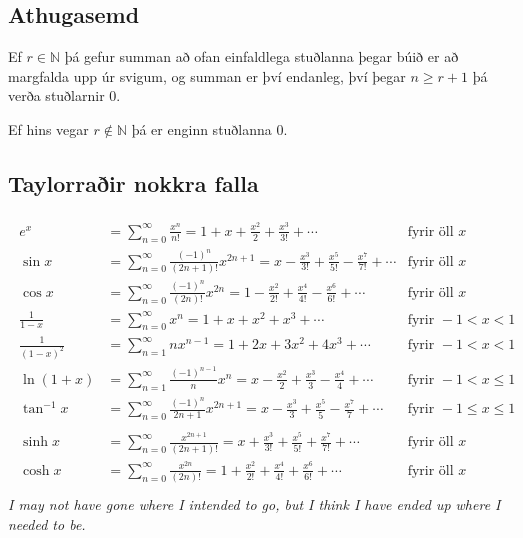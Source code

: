 \documentclass[b5paper,11pt,icelandic]{sphinxmanual}
\begin{document}
\subsection{Athugasemd}
\label{kafli10:id6}
Ef \(r \in {{\mathbb  N}}\) þá gefur summan að ofan einfaldlega
stuðlanna þegar búið er að margfalda upp úr svigum, og summan er því
endanleg, því þegar \(n \geq r+1\) þá verða stuðlarnir 0.

Ef hins vegar \(r\notin {{\mathbb  N}}\) þá er enginn stuðlanna 0.


\subsection{Taylorraðir nokkra falla}
\label{kafli10:taylorrair-nokkra-falla}\begin{equation*}
\begin{split}\begin{aligned}
e^x&=\sum_{n=0}^\infty\frac{x^n}{n!}
    =1+x+\frac{x^2}{2}+\frac{x^3}{3!}
    +\cdots
  &\mbox{fyrir öll }x\\
\sin x&=  \sum_{n=0}^\infty\frac{(-1)^n}{(2n+1)!}x^{2n+1}
    =x-\frac{x^3}{3!}+\frac{x^5}{5!}-\frac{x^7}{7!}+\cdots
    &\mbox{fyrir öll }x\\
\cos x&=  \sum_{n=0}^\infty\frac{(-1)^n}{(2n)!}x^{2n}
    =1-\frac{x^2}{2!}+\frac{x^4}{4!}-\frac{x^6}{6!}+\cdots
    &\mbox{fyrir öll }x\\
\frac{1}{1-x}&=\sum_{n=0}^\infty x^n
    =1+x+x^2+x^3+\cdots
&\mbox{fyrir }-1<x<1\\
\frac{1}{(1-x)^2}&=\sum_{n=1}^\infty nx^{n-1}
    =1+2x+3x^2+4x^3+\cdots
&\mbox{fyrir }-1<x<1\\
\ln(1+x)&=  \sum_{n=1}^\infty\frac{(-1)^{n-1}}{n}x^n
    =x-\frac{x^2}{2}+\frac{x^3}{3}-\frac{x^4}{4}+\cdots
    &\mbox{fyrir }-1<x\leq 1\\
\tan^{-1} x&=  \sum_{n=0}^\infty\frac{(-1)^n}{2n+1}x^{2n+1}
    =x-\frac{x^3}{3}+\frac{x^5}{5}-\frac{x^7}{7}+\cdots
    &\mbox{fyrir }-1\leq x\leq 1\\\\
\sinh x&=  \sum_{n=0}^\infty\frac{x^{2n+1}}{(2n+1)!}
    =x+\frac{x^3}{3!}+\frac{x^5}{5!}+\frac{x^7}{7!}+\cdots
    &\mbox{fyrir öll } x\\
\cosh x&=  \sum_{n=0}^\infty\frac{x^{2n}}{(2n)!}
    =1+\frac{x^2}{2!}+\frac{x^4}{4!}+\frac{x^6}{6!}+\cdots
    &\mbox{fyrir öll } x\\\end{aligned}\end{split}
\end{equation*}
\emph{I may not have gone where I intended to go, but I think I have ended up where I needed to be.}
\end{document}
